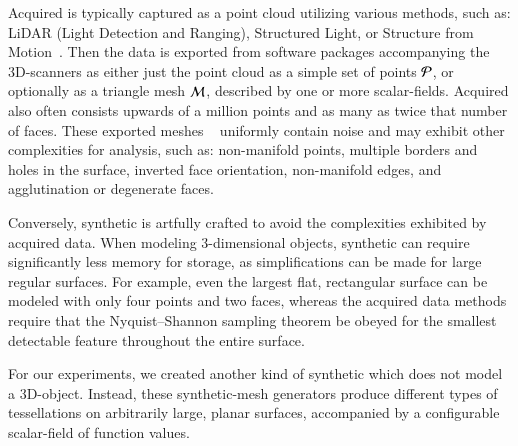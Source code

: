 {{Acquired \tdd{} is typically captured as a point cloud utilizing various methods, such as: LiDAR (Light Detection and Ranging), Structured Light, or Structure from Motion~\cite[p.~19]{Mara12}. Then the data is exported from software packages accompanying the 3D-scanners as either just the point cloud as a simple set of points $\mathcal{P}$, or optionally as a triangle mesh $\mathcal{M}$, described by one or more scalar-fields. Acquired \tdd{} also often consists upwards of a million points and as many as twice that number of faces. These exported meshes ~\cite[p.~25]{Mara12} uniformly contain noise and may exhibit other complexities for analysis, such as: non-manifold points, multiple borders and holes in the surface, inverted face orientation, non-manifold edges, and agglutination or degenerate faces. ~\cite[p.~28-32]{Mara12}

Conversely, synthetic \tdd{} is artfully crafted to avoid the complexities exhibited by acquired data. When modeling 3-dimensional objects, synthetic \tdd{} can require significantly less memory for storage, as simplifications can be made for large regular surfaces. For example, even the largest flat, rectangular surface can be modeled with only four points and two faces, whereas the acquired data methods require that the Nyquist–Shannon sampling theorem be obeyed for the smallest detectable feature throughout the entire surface.~\cite[p.~19]{Mara12}~\cite[p.~3]{Mara17}

For our experiments, we created another kind of synthetic \tdd{} which does not model a 3D-object. Instead, these synthetic-mesh generators produce different types of tessellations on arbitrarily large, planar surfaces, accompanied by a configurable scalar-field of function values.

%
%
%
}}

